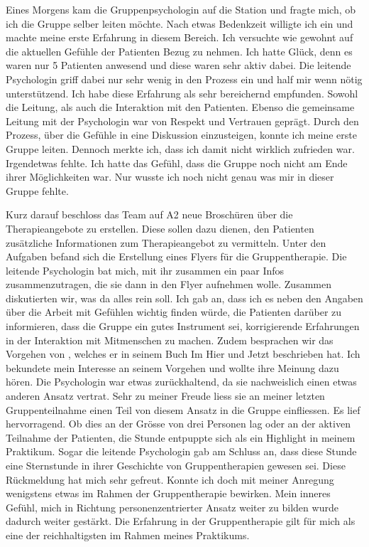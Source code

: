 Eines Morgens kam die Gruppenpsychologin auf die Station und fragte mich, ob ich die Gruppe selber leiten möchte. Nach etwas Bedenkzeit willigte ich ein und machte meine erste Erfahrung in diesem Bereich. Ich versuchte wie gewohnt auf die aktuellen Gefühle der Patienten Bezug zu nehmen. Ich hatte Glück, denn es waren nur 5 Patienten anwesend und diese waren sehr aktiv dabei. Die leitende Psychologin griff dabei nur sehr wenig in den Prozess ein und half mir wenn nötig unterstützend. Ich habe diese Erfahrung als sehr bereichernd empfunden. Sowohl die Leitung, als auch die Interaktion mit den Patienten. Ebenso die gemeinsame Leitung mit der Psychologin war von Respekt und Vertrauen geprägt. Durch den Prozess, über die Gefühle in eine Diskussion einzusteigen, konnte ich meine erste Gruppe leiten. Dennoch merkte ich, dass ich damit nicht wirklich zufrieden war. Irgendetwas fehlte. Ich hatte das Gefühl, dass die Gruppe noch nicht am Ende ihrer Möglichkeiten war. Nur wusste ich noch nicht genau was mir in dieser Gruppe fehlte. 

Kurz darauf beschloss das Team auf A2 neue Broschüren über die Therapieangebote zu erstellen. Diese sollen dazu dienen, den Patienten zusätzliche Informationen zum Therapieangebot zu vermitteln. Unter den Aufgaben befand sich die Erstellung eines Flyers für die Gruppentherapie. Die leitende Psychologin bat mich, mit ihr zusammen ein paar Infos zusammenzutragen, die sie dann in den Flyer aufnehmen wolle. Zusammen diskutierten wir, was da alles rein soll. Ich gab an, dass ich es neben den Angaben über die Arbeit mit Gefühlen wichtig finden würde, die Patienten darüber zu informieren, dass die Gruppe ein gutes Instrument sei, korrigierende Erfahrungen in der Interaktion mit Mitmenschen zu machen. Zudem besprachen wir das Vorgehen von , welches er in seinem Buch \glqq Im Hier und Jetzt\grqq{} beschrieben hat. Ich bekundete mein Interesse an seinem Vorgehen und wollte ihre Meinung dazu hören. Die Psychologin war etwas zurückhaltend, da sie nachweislich einen etwas anderen Ansatz vertrat. Sehr zu meiner Freude liess sie an meiner letzten Gruppenteilnahme einen Teil von diesem Ansatz in die Gruppe einfliessen. Es lief hervorragend. Ob dies an der Grösse von drei Personen lag oder an der aktiven Teilnahme der Patienten, die Stunde entpuppte sich als ein Highlight in meinem Praktikum. Sogar die leitende Psychologin gab am Schluss an, dass diese Stunde eine Sternstunde in ihrer Geschichte von Gruppentherapien gewesen sei. Diese Rückmeldung hat mich sehr gefreut. Konnte ich doch mit meiner Anregung wenigstens etwas im Rahmen der Gruppentherapie bewirken. Mein inneres Gefühl, mich in Richtung personenzentrierter Ansatz weiter zu bilden wurde dadurch weiter gestärkt. Die Erfahrung in der Gruppentherapie gilt für mich als eine der reichhaltigsten im Rahmen meines Praktikums.

